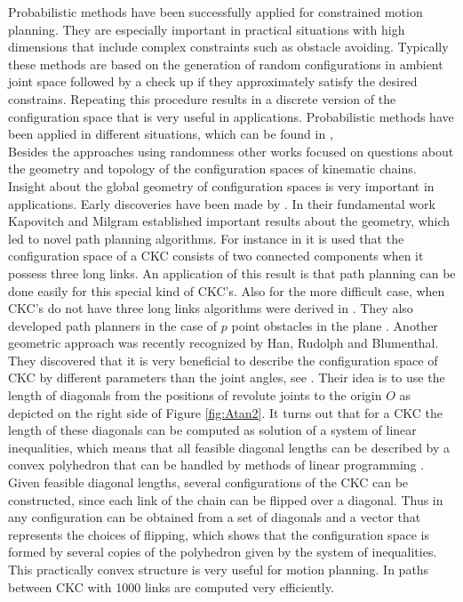 \documentclass[10pt,a4paper]{article}
\theoremstyle{definition}
\theoremstyle{remark}
\numberwithin{equation}{section}
\begin{document}
Probabilistic methods have been successfully applied for constrained motion planning. They are especially important in practical situations with high dimensions that include complex constraints such as obstacle avoiding. Typically these methods are based on the generation of random configurations in ambient joint space followed by a check up if they approximately satisfy the desired constrains. Repeating this procedure results in a discrete version of the configuration space that is very useful in applications. Probabilistic  methods have been applied in different situations, which can be found in 
\cite{suthakorn2001new,CorSim04,jaillet2013path,SLaV99,SLaV06,zhang2013unbiased,yakey2001randomized},\\


Besides the approaches using randomness other works focused on questions about the geometry and topology of the  configuration spaces of kinematic chains. Insight about the global geometry of configuration spaces is very important in applications. Early discoveries have been made by \cite{KapMil95, HAUKNU98}. In their fundamental work Kapovitch and Milgram established important results about the geometry, which led to novel path planning algorithms. For instance in \cite{JamesRTrinkleJ02a,JamesRTrinkleJ02b} it is used that the configuration space of a CKC consists of two connected components when it possess three long links. An application of this result is that path planning can be done easily for this special kind of CKC's. Also for the more difficult case, when CKC's do not have three long links algorithms were derived in \cite{JamesRTrinkleJ02a,JamesRTrinkleJ02b}. They also developed path planners in the case of $p$ point obstacles in the plane \cite{liu2005toward}. Another geometric approach was recently recognized by  Han, Rudolph and Blumenthal. They discovered that it is very beneficial to describe the configuration space of CKC by different parameters than the joint angles, see \cite{HanRudBlumVal, han2008conv, han2006inverse}. Their idea is to use the length of diagonals from the positions of revolute joints to the origin $O$ as depicted on the right side of Figure \ref{fig:Atan2}. It turns out that for a CKC the length of these diagonals can be computed as solution of a system of linear inequalities, which means that all feasible diagonal lengths can be described by a convex polyhedron that can be handled by methods of linear programming \cite{luenberger2015linear}. Given feasible diagonal lengths, several configurations of the CKC can be constructed, since each link of the chain can be flipped over a diagonal. Thus in \cite{HanRudBlumVal,han2008conv} any configuration can be obtained from a set of diagonals and a vector that represents the choices of flipping, which shows that the configuration space is formed by several copies of the polyhedron given by the system of inequalities. This practically convex structure is very useful for motion planning. In \cite{han2006inverse,han2008conv} paths between CKC with 1000 links are computed very efficiently.\\        
\end{document}
